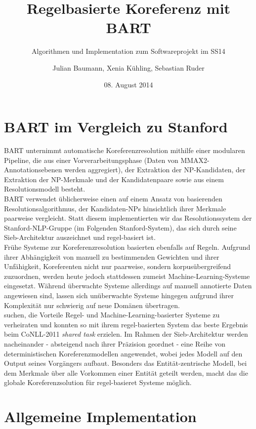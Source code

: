 \documentclass{scrartcl}
\author{Julian Baumann, Xenia Kühling, Sebastian Ruder}
\date{08. August 2014}
\title{Regelbasierte Koreferenz mit BART}
\subtitle{Algorithmen und Implementation zum Softwareprojekt im SS14}
\begin{document}
\maketitle
\section{BART im Vergleich zu Stanford}

BART unternimmt automatische Koreferenzresolution mithilfe einer modularen Pipeline, die aus einer Vorverarbeitungsphase (Daten von MMAX2-Annotationsebenen werden aggregiert), der Extraktion der NP-Kandidaten, der Extraktion der NP-Merkmale und der Kandidatenpaare sowie aus einem Resolutionsmodell besteht.\\
BART verwendet üblicherweise einen auf einem Ansatz von  basierenden Resolutionsalgorithmus, der Kandidaten-NPs hinsichtlich ihrer Merkmale paarweise vergleicht. Statt diesem implementierten wir das Resolutionssystem der Stanford-NLP-Gruppe (im Folgenden Stanford-System), das sich durch seine Sieb-Architektur auszeichnet und regel-basiert ist.\\
Frühe Systeme zur Koreferenzresolution basierten ebenfalls auf Regeln. Aufgrund ihrer Abhängigkeit von manuell zu bestimmenden Gewichten und ihrer Unfähigkeit, Koreferenten nicht nur paarweise, sondern korpusübergreifend zuzuordnen, werden heute jedoch stattdessen zumeist Machine-Learning-Systeme eingesetzt. Während überwachte Systeme allerdings auf manuell annotierte Daten angewiesen sind, lassen sich unüberwachte Systeme hingegen aufgrund ihrer Komplexität nur schwierig auf neue Domänen übertragen.\\
 suchen, die Vorteile Regel- und Machine-Learning-basierter Systeme zu verheiraten und konnten so mit ihrem regel-basierten System das beste Ergebnis beim CoNLL-2011 \textit{shared task} erzielen. Im Rahmen der Sieb-Architektur werden nacheinander - absteigend nach ihrer Präzision geordnet - eine Reihe von deterministischen Koreferenzmodellen angewendet, wobei jedes Modell auf den Output seines Vorgängers aufbaut. Besonders das Entität-zentrische Modell, bei dem Merkmale über alle Vorkommen einer Entität geteilt werden, macht das die globale Koreferenzsolution für regel-basieret Systeme möglich.

\section{Allgemeine Implementation}
\end{document}
